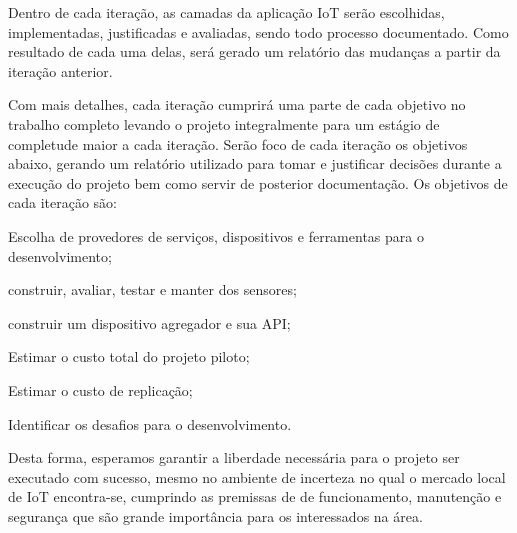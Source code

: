 Dentro de cada iteração, as camadas da aplicação IoT serão escolhidas,
implementadas, justificadas e avaliadas, sendo todo processo documentado. Como
resultado de cada uma delas, será gerado um relatório das mudanças a partir da
iteração anterior.

Com mais detalhes, cada iteração cumprirá uma parte de cada objetivo no trabalho
completo levando o projeto integralmente para um estágio de completude maior a
cada iteração. Serão foco de cada iteração os objetivos abaixo, gerando um
relatório utilizado para tomar e justificar decisões durante a execução do
projeto bem como servir de posterior documentação. Os objetivos de cada iteração
são:

\begin{alineas}

	\item Escolha de provedores de serviços, dispositivos e ferramentas para o
desenvolvimento;

	\item construir, avaliar, testar e manter dos sensores;

	\item construir um dispositivo agregador e sua API;

	\item Estimar o custo total do projeto piloto;

	\item Estimar o custo de replicação;

	\item Identificar os desafios para o desenvolvimento.

\end{alineas}

Desta forma, esperamos garantir a liberdade necessária para o projeto ser
executado com sucesso, mesmo no ambiente de incerteza no qual o mercado local de
IoT encontra-se, cumprindo as premissas de de funcionamento, manutenção e
segurança que são grande importância para os interessados na área.

